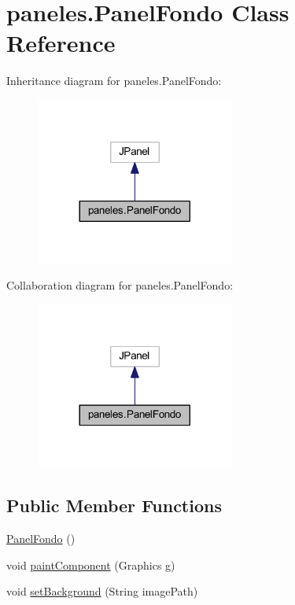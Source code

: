 \hypertarget{classpaneles_1_1_panel_fondo}{}\section{paneles.\+Panel\+Fondo Class Reference}
\label{classpaneles_1_1_panel_fondo}


Inheritance diagram for paneles.\+Panel\+Fondo\+:\nopagebreak
\begin{figure}[H]
\begin{center}
\leavevmode
\includegraphics[width=185pt]{classpaneles_1_1_panel_fondo__inherit__graph}
\end{center}
\end{figure}


Collaboration diagram for paneles.\+Panel\+Fondo\+:\nopagebreak
\begin{figure}[H]
\begin{center}
\leavevmode
\includegraphics[width=185pt]{classpaneles_1_1_panel_fondo__coll__graph}
\end{center}
\end{figure}
\subsection*{Public Member Functions}
\begin{DoxyCompactItemize}
\item 
\mbox{\hyperlink{classpaneles_1_1_panel_fondo_a64adb64396f808c54e8d9c5383a45531}{Panel\+Fondo}} ()
\item 
void \mbox{\hyperlink{classpaneles_1_1_panel_fondo_aeaeb3ac61110f0e637b22afc5111e9d7}{paint\+Component}} (Graphics g)
\item 
void \mbox{\hyperlink{classpaneles_1_1_panel_fondo_ae95bde361bef113903c6fa6b1b65acf2}{set\+Background}} (String image\+Path)
\end{DoxyCompactItemize}


